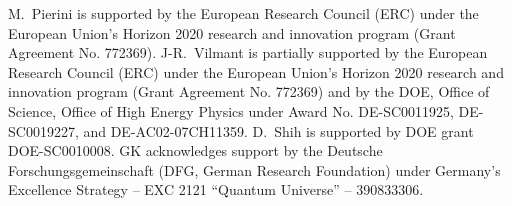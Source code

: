 \documentclass[a4paper,11pt]{article}
\begin{document}
M.~Pierini is supported by the European Research Council (ERC) under the European Union's Horizon 2020 research and innovation program (Grant Agreement No. 772369). J-R.~Vilmant is partially supported by the European Research Council (ERC) under the European Union's Horizon 2020 research and innovation program (Grant Agreement No. 772369) and by the DOE, Office of Science, Office of High Energy Physics under Award No. DE-SC0011925, DE-SC0019227, and DE-AC02-07CH11359. D.~Shih is supported by DOE grant DOE-SC0010008. GK acknowledges support by the Deutsche Forschungsgemeinschaft (DFG, German Re\-search Foundation) under Germany’s Excellence Strategy – EXC 2121 ``Quantum Universe'' – 390833306.


 
\end{document}
